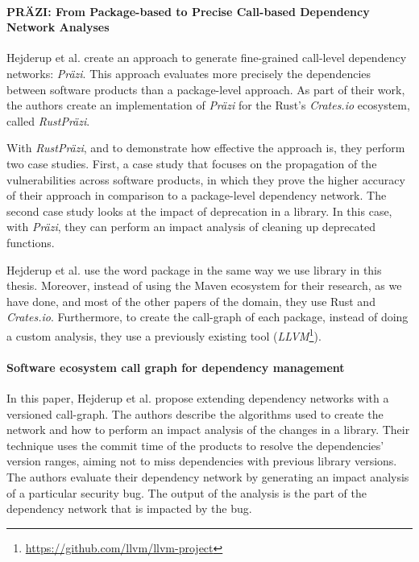 \paragraph{PRÄZI: From Package-based to Precise Call-based Dependency Network Analyses \cite{hejderup2018prazi}}
Hejderup et al. create an approach to generate fine-grained call-level dependency networks: \textit{Präzi}. This approach evaluates more precisely the dependencies between software products than a package-level approach. As part of their work, the authors create an implementation of \textit{Präzi} for the Rust's \textit{Crates.io} ecosystem, called \textit{RustPräzi}.

With \textit{RustPräzi}, and to demonstrate how effective the approach is, they perform two case studies. First, a case study that focuses on the propagation of the vulnerabilities across software products, in which they prove the higher accuracy of their approach in comparison to a package-level dependency network. The second case study looks at the impact of deprecation in a library. In this case, with \textit{Präzi}, they can perform an impact analysis of cleaning up deprecated functions.

Hejderup et al. use the word package in the same way we use library in this thesis. Moreover, instead of using the Maven ecosystem for their research, as we have done, and most of the other papers of the domain, they use Rust and \textit{Crates.io}. Furthermore, to create the call-graph of each package, instead of doing a custom analysis, they use a previously existing tool (\textit{LLVM}\footnote{\href{https://github.com/llvm/llvm-project}{https://github.com/llvm/llvm-project}}).

\paragraph{Software ecosystem call graph for dependency management \cite{hejderup2018software}}
In this paper, Hejderup et al. propose extending dependency networks with a versioned call-graph. The authors describe the algorithms used to create the network and how to perform an impact analysis of the changes in a library. Their technique uses the commit time of the products to resolve the dependencies' version ranges, aiming not to miss dependencies with previous library versions. The authors evaluate their dependency network by generating an impact analysis of a particular security bug. The output of the analysis is the part of the dependency network that is impacted by the bug.

